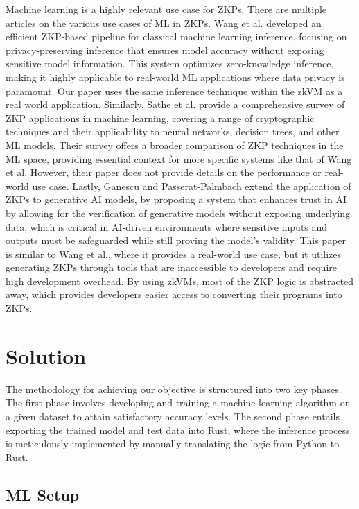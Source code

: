\documentclass{scrartcl}
\begin{document}
Machine learning is a highly relevant use case for ZKPs. There are multiple articles on the various use cases of ML in ZKPs. Wang et al.\cite{wang2024efficient} developed an efficient ZKP-based pipeline for classical machine learning inference, focusing on privacy-preserving inference that ensures model accuracy without exposing sensitive model information. This system optimizes zero-knowledge inference, making it highly applicable to real-world ML applications where data privacy is paramount. Our paper uses the same inference technique within the zkVM as a real world application. Similarly, Sathe et al.\cite{sathe2024survey} provide a comprehensive survey of ZKP applications in machine learning, covering a range of cryptographic techniques and their applicability to neural networks, decision trees, and other ML models. Their survey offers a broader comparison of ZKP techniques in the ML space, providing essential context for more specific systems like that of Wang et al. However, their paper does not provide details on the performance or real-world use case. Lastly, Ganescu and Passerat-Palmbach\cite{ganescu2024trust} extend the application of ZKPs to generative AI models, by proposing a system that enhances trust in AI by allowing for the verification of generative models without exposing underlying data, which is critical in AI-driven environments where sensitive inputs and outputs must be safeguarded while still proving the model’s validity. This paper is similar to Wang et al., where it provides a real-world use case, but it utilizes generating ZKPs through tools that are inaccessible to developers and require high development overhead. By using zkVMs, most of the ZKP logic is abstracted away, which provides developers easier access to converting their programs into ZKPs.

\section{Solution}

The methodology for achieving our objective is structured into two key phases. The first phase involves developing and training a machine learning algorithm on a given dataset to attain satisfactory accuracy levels. The second phase entails exporting the trained model and test data into Rust, where the inference process is meticulously implemented by manually translating the logic from Python to Rust.

\subsection{ML Setup}
\end{document}
